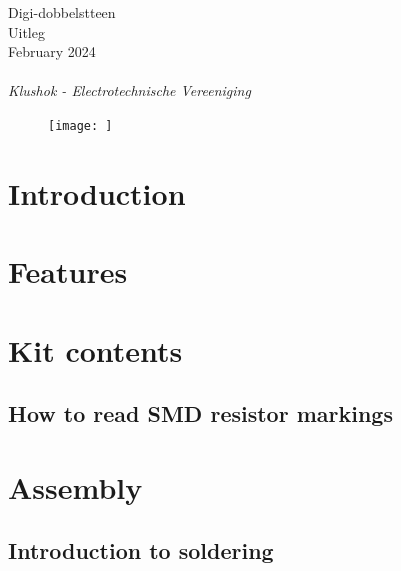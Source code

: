 \documentclass[12pt]{article}
\begin{document}
\raggedright

\begin{center}
	\LARGE{Digi-dobbelstteen}\\
        \Large{Uitleg}\\
	\large{February 2024}\\
	~\\
	\large{\emph{Klushok - Electrotechnische Vereeniging}}\\
\end{center}

\reversemarginpar

\begin{figure}[H]
	\centering
	\texttt{[image: ]} %
\end{figure}
\newpage




\section{Introduction}


\section{Features}




\section{Kit contents} \label{sec:KitContent}


\subsection{How to read SMD resistor markings}


\section{Assembly}


\subsection{Introduction to soldering}
\end{document}
